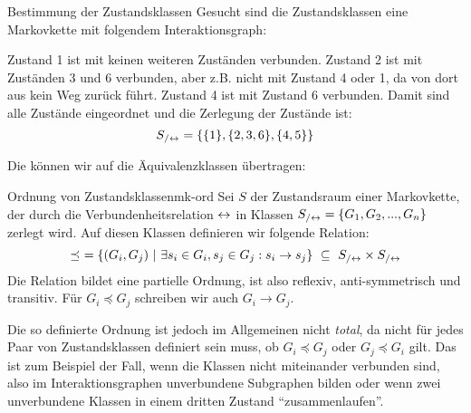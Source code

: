 \begin{example}{Bestimmung der Zustandsklassen}{}
Gesucht sind die Zustandsklassen eine Markovkette mit folgendem Interaktionsgraph:

\begin{centering}
\end{centering}

Zustand 1 ist mit keinen weiteren Zuständen verbunden.
Zustand 2 ist mit Zuständen 3 und 6 verbunden, aber z.B. nicht mit Zustand 4
oder 1, da von dort aus kein Weg zurück führt.
Zustand 4 ist mit Zustand 6 verbunden.
Damit sind alle Zustände eingeordnet und die Zerlegung der Zustände ist:
\[
S_{/\leftrightarrow} = \{\{1\}, \{2,3,6\}, \{4, 5\}\}
\]
\end{example}

Die  können wir auf die
Äquivalenzklassen übertragen:
\begin{definition}{Ordnung von Zustandsklassen}{mk-ord}
Sei $S$ der Zustandsraum einer Markovkette, der durch die Verbundenheitsrelation
$\leftrightarrow$ in Klassen $S_{/\leftrightarrow}=\{G_1, G_2,...,G_n\}$ zerlegt wird. Auf diesen
Klassen definieren wir folgende Relation:
\[
\preceq\ =\{(G_i, G_j)\ |\ \exists s_i\in G_i, s_j\in G_j: s_i\to s_j\}\ \subseteq\ S_{/\leftrightarrow}\times S_{/\leftrightarrow}
\]
Die Relation bildet eine partielle Ordnung, ist also reflexiv, anti-symmetrisch und transitiv. Für
$G_i\preceq G_j$ schreiben wir auch $G_i\to G_j$.
\end{definition}

Die so definierte Ordnung ist jedoch im Allgemeinen nicht \emph{total}, da nicht
für jedes Paar von Zustandsklassen definiert sein muss, ob $G_i\preceq G_j$ oder
$G_j \preceq G_i$ gilt. Das ist zum Beispiel der Fall, wenn die Klassen nicht
miteinander verbunden sind, also im Interaktionsgraphen unverbundene Subgraphen
bilden oder wenn zwei unverbundene Klassen in einem dritten Zustand
"`zusammenlaufen"'.

